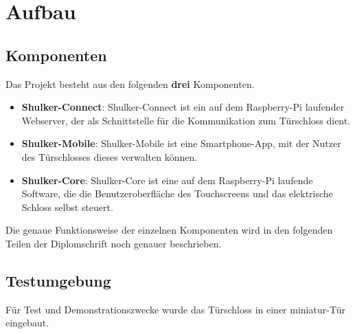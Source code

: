 \chapter{Aufbau}

\section{Komponenten}

Das Projekt besteht aus den folgenden \textbf{drei} Komponenten.


\begin{itemize}
    \item \textbf{Shulker-Connect}: Shulker-Connect ist ein auf dem Raspberry-Pi laufender Webserver, der als Schnittstelle für die Kommunikation zum Türschloss dient. 
    \item \textbf{Shulker-Mobile}: Shulker-Mobile ist eine Smartphone-App, mit der Nutzer des Türschlosses dieses verwalten können.
    \item \textbf{Shulker-Core}: Shulker-Core ist eine auf dem Raspberry-Pi laufende Software, die die Benutzeroberfläche des Touchscreens und das elektrische Schloss selbst steuert.
\end{itemize}

Die genaue Funktionsweise der einzelnen Komponenten wird in den folgenden Teilen der Diplomschrift noch genauer beschrieben.

\section{Testumgebung}

Für Test und Demonstrationszwecke wurde das Türschloss in einer miniatur-Tür eingebaut. 
